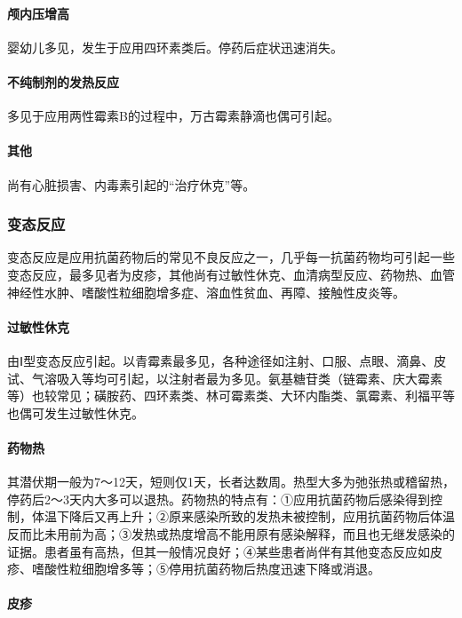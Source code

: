 \paragraph{颅内压增高}

婴幼儿多见，发生于应用四环素类后。停药后症状迅速消失。

\paragraph{不纯制剂的发热反应}

多见于应用两性霉素B的过程中，万古霉素静滴也偶可引起。

\paragraph{其他}

尚有心脏损害、内毒素引起的“治疗休克”等。

\subsubsection{变态反应}

变态反应是应用抗菌药物后的常见不良反应之一，几乎每一抗菌药物均可引起一些变态反应，最多见者为皮疹，其他尚有过敏性休克、血清病型反应、药物热、血管神经性水肿、嗜酸性粒细胞增多症、溶血性贫血、再障、接触性皮炎等。

\paragraph{过敏性休克}

由Ⅰ型变态反应引起。以青霉素最多见，各种途径如注射、口服、点眼、滴鼻、皮试、气溶吸入等均可引起，以注射者最为多见。氨基糖苷类（链霉素、庆大霉素等）也较常见；磺胺药、四环素类、林可霉素类、大环内酯类、氯霉素、利福平等也偶可发生过敏性休克。

\paragraph{药物热}

其潜伏期一般为7～12天，短则仅1天，长者达数周。热型大多为弛张热或稽留热，停药后2～3天内大多可以退热。药物热的特点有：①应用抗菌药物后感染得到控制，体温下降后又再上升；②原来感染所致的发热未被控制，应用抗菌药物后体温反而比未用前为高；③发热或热度增高不能用原有感染解释，而且也无继发感染的证据。患者虽有高热，但其一般情况良好；④某些患者尚伴有其他变态反应如皮疹、嗜酸性粒细胞增多等；⑤停用抗菌药物后热度迅速下降或消退。

\paragraph{皮疹}

